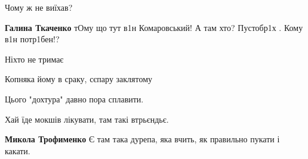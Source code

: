 \begin{itemize}
Чому ж не виїхав?

\begin{itemize}
 
\textbf{Галина Ткаченко} тОму що тут в1н Комаровський! А там хто? Пустобр1х . Кому в1н потр1бен!?
\end{itemize}

 
Ніхто не тримає

 
Копняка йому в сраку, сєпару заклятому

 
Цього "дохтура" давно пора сплавити.

 
Хай їде мокшів лікувати, там такі втрьєндьє.

\begin{itemize}
 
\textbf{Микола Трофименко} Є там така дурепа, яка вчить, як правильно пукати і какати.
\end{itemize}


\end{itemize}
